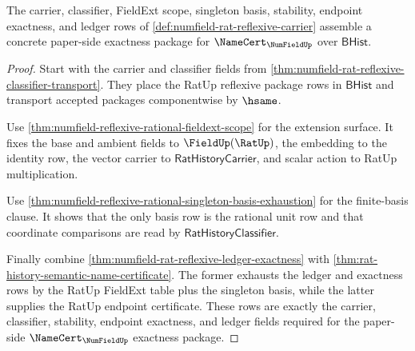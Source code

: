 \begin{theorem}
\label{thm:numfield-reflexive-rational-exactness-package}
The carrier, classifier, FieldExt scope, singleton basis, stability, endpoint
exactness, and ledger rows of \autoref{def:numfield-rat-reflexive-carrier}
assemble a concrete paper-side exactness package for
$\NameCert_{\NumFieldUp}$ over $\mathsf{BHist}$.
\end{theorem}
\begin{proof}
Start with the carrier and classifier fields from
\autoref{thm:numfield-rat-reflexive-classifier-transport}. They place the
RatUp reflexive package rows in $\mathsf{BHist}$ and transport accepted
packages componentwise by $\hsame$.

Use
\autoref{thm:numfield-reflexive-rational-fieldext-scope} for the extension
surface. It fixes the base and ambient fields to $\FieldUp(\RatUp)$, the
embedding to the identity row, the vector carrier to
$\mathsf{RatHistoryCarrier}$, and scalar action to RatUp multiplication.

Use
\autoref{thm:numfield-reflexive-rational-singleton-basis-exhaustion} for the
finite-basis clause. It shows that the only basis row is the rational unit row
and that coordinate comparisons are read by
$\mathsf{RatHistoryClassifier}$.

Finally combine
\autoref{thm:numfield-rat-reflexive-ledger-exactness} with
\autoref{thm:rat-history-semantic-name-certificate}. The former exhausts the
ledger and exactness rows by the RatUp FieldExt table plus the singleton
basis, while the latter supplies the RatUp endpoint certificate. These rows
are exactly the carrier, classifier, stability, endpoint exactness, and ledger
fields required for the paper-side $\NameCert_{\NumFieldUp}$ exactness
package.
\end{proof}
